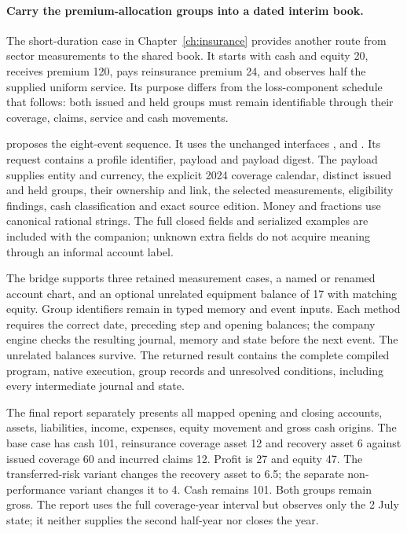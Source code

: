 \paragraph{Carry the premium-allocation groups into a dated interim book.}
\label{sec:insurance-paa-dated-book}
The short-duration case in Chapter~\ref{ch:insurance} provides another route
from sector measurements to the shared book. It starts with cash and equity
20, receives premium 120, pays reinsurance premium 24, and observes half the
supplied uniform service. Its purpose differs from the loss-component schedule
that follows: both issued and held groups must remain identifiable through
their coverage, claims, service and cash movements.

 proposes the eight-event sequence. It uses
the unchanged interfaces ,
 and .
Its request contains a profile identifier, payload
and payload digest. The payload supplies entity and currency, the explicit
2024 coverage calendar, distinct issued and held groups, their ownership and
link, the selected measurements, eligibility findings, cash classification
and exact source edition. Money and fractions use canonical rational strings.
The full closed fields and serialized examples are included with the companion;
unknown extra fields do not acquire meaning through an informal account label.

The bridge supports three retained measurement cases, a named or renamed
account chart, and an optional unrelated equipment balance of 17 with matching
equity. Group identifiers remain in typed memory and event inputs. Each method
requires the correct date, preceding step and opening balances; the company
engine checks the resulting journal, memory and state before the next event.
The unrelated balances survive. The returned 
result contains the complete compiled program, native execution, group records
and unresolved conditions, including every intermediate journal and state.

The final report separately presents all mapped opening and closing accounts,
assets, liabilities, income, expenses, equity movement and gross cash origins.
The base case has cash 101, reinsurance coverage asset 12 and recovery asset 6
against issued coverage 60 and incurred claims 12. Profit is 27 and equity 47.
The transferred-risk variant changes the recovery asset to 6.5; the separate
non-performance variant changes it to 4. Cash remains 101. Both groups remain
gross. The report uses the full coverage-year interval but observes only the
2 July state; it neither supplies the second half-year nor closes the year.

